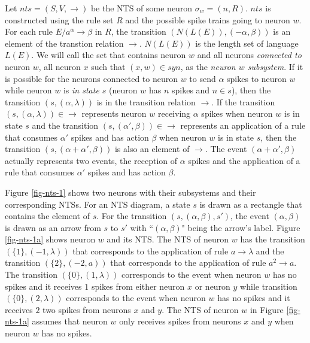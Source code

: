 \documentclass[]{elsarticle}
\theoremstyle{definition}
\theoremstyle{definition}
\newcommand{\ra}{\rightarrow}
\begin{document}

Let $nts = (S,V,\ra)$ be the NTS of some neuron $\sigma_w=(n,R)$. $nts$ is constructed using the 
rule set $R$ and the possible spike trains going to neuron $w$. For each rule $E/a^{\alpha} \ra 
\beta$ in $R$, the transition $(N(L(E)),(-\alpha, \beta))$ is an element of the transtion relation 
$\ra$. $N(L(E))$ is the length set of language $L(E)$. We will call the set that contains neuron $w$ 
and all neurons \emph{connected to} neuron $w$, all neuron $x$ such that $(x,w) \in syn$, as the 
\emph{neuron $w$ subsystem}. If it is possible for the neurons connected to neuron $w$ to send 
$\alpha$ spikes to neuron $w$ while neuron $w$ is \emph{in state $s$} (neuron $w$ has $n$ spikes and
 $n\in s$), then the transition $(s,(\alpha,\lambda))$ is in the transition relation $\ra$. If the 
transition $(s,(\alpha,\lambda)) \in \ra$ represents neuron $w$ receiving $\alpha$ spikes when 
neuron $w$ is in state  $s$ and the transition $(s,(\alpha',\beta)) \in \ra$ represents an 
application of a rule that consumes $\alpha'$ spikes and has action $\beta$ when neuron $w$ is in 
state $s$, then the transition $(s,(\alpha+\alpha',\beta))$ is also an element of $\ra$. The 
event $(\alpha+\alpha',\beta)$ actually represents two events, the reception of $\alpha$ spikes and 
the application of a rule that consumes $\alpha'$ spikes and has action $\beta$. 


Figure \ref{fig-nts-1} shows two neurons with their subsystems and their corresponding NTSs. For an
NTS diagram, a state $s$ is drawn as a rectangle that contains the element of $s$. For the 
transition $(s,(\alpha,\beta),s')$, the event $(\alpha,\beta)$ is drawn as an arrow from $s$ to
$s'$ with ``$(\alpha,\beta)$" being the arrow's label. Figure \ref{fig-nts-1a} shows neuron $w$ and
its NTS. The NTS of neuron $w$ has the transition $(\{1\},(-1,\lambda))$ that corresponds to the
application of rule  $a\ra\lambda$ and the transition $(\{2\},(-2,a))$ that corresponds to the 
application of rule $a^2\ra a$. The transition $(\{0\},(1,\lambda))$ corresponds to the event when 
neuron $w$ has no spikes and it receives $1$ spikes from either neuron $x$ or neuron $y$ while 
transition $(\{0\},(2,\lambda))$ corresponds to the event when neuron $w$ has no spikes and it 
receives $2$ two spikes from neurons $x$ and $y$. The NTS of neuron $w$ in Figure \ref{fig-nts-1a}
assumes that neuron $w$ only receives spikes from neurons $x$ and $y$ when neuron $w$ has no spikes.
\end{document}
